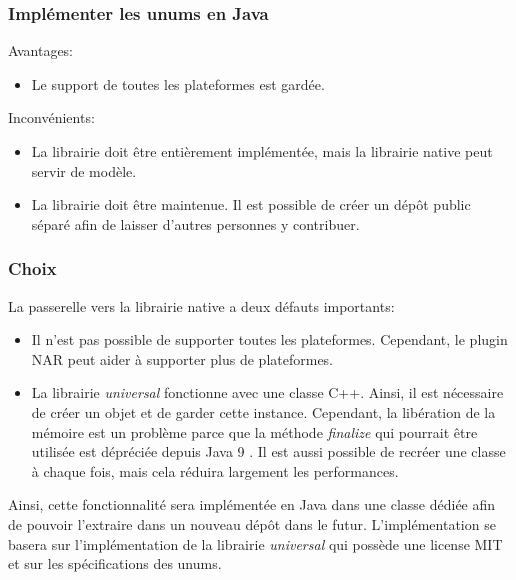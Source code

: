 \subsubsection{Implémenter les unums en Java}

Avantages:
\begin{itemize}
    \item Le support de toutes les plateformes est gardée.
\end{itemize}

Inconvénients:
\begin{itemize}
    \item La librairie doit être entièrement implémentée, mais la librairie native peut servir de modèle.
    \item La librairie doit être maintenue. Il est possible de créer un dépôt public séparé afin de laisser d'autres personnes y contribuer.
\end{itemize}

\subsubsection{Choix}

La passerelle vers la librairie native a deux défauts importants:
\begin{itemize}
    \item Il n'est pas possible de supporter toutes les plateformes. Cependant, le plugin NAR \cite{nar-maven-plugin} peut aider à supporter plus de plateformes.
    \item La librairie \textit{universal} fonctionne avec une classe C++. Ainsi, il est nécessaire de créer un objet et de garder cette instance. Cependant, la libération de la mémoire est un problème parce que la méthode \textit{finalize} qui pourrait être utilisée est dépréciée depuis Java 9 \cite{java-finalize-documentation}. Il est aussi possible de recréer une classe à chaque fois, mais cela réduira largement les performances.
\end{itemize}

Ainsi, cette fonctionnalité sera implémentée en Java dans une classe dédiée afin de pouvoir l'extraire dans un nouveau dépôt dans le futur. L'implémentation se basera sur l'implémentation de la librairie \textit{universal} qui possède une license MIT et sur les spécifications des unums.